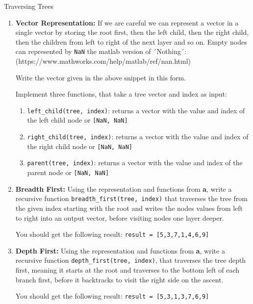 \begin{task}{Traversing Trees}{}{}
  \begin{enumerate}

    \item{\textbf{Vector
            Representation:}
          If we are careful we can represent a vector in a single vector by
          storing the root first, then the left child, then the right child, then
          the children from left to right of the next layer and so on. Empty nodes
          can represented by \lstinline!NaN! the matlab version of
          ´Nothing´: (https://www.mathworks.com/help/matlab/ref/nan.html)

          Write the vector given in the above snippet in this form.

          Implement three functions, that take a tree vector and index as input:
          \begin{enumerate}
            \item{
                  \lstinline!left_child(tree, index)!: returns a vector
                  with the value and index of the left child node or
                  \lstinline![NaN, NaN]!
                  }
            \item{
                  \lstinline!right_child(tree, index)!: returns a vector
                  with the value and index of the right child node or
                  \lstinline![NaN, NaN]!
                  }
            \item{
                  \lstinline!parent(tree, index)!: returns a vector with the
                  value and index of the parent node or \lstinline![NaN, NaN]!
                  }
          \end{enumerate}
          }

    \item{\textbf{Breadth First:}
          Using the representation and functions from \textbf{a}, write a
          recursive function \lstinline!breadth_first(tree, index)!
          that traverses the tree from the given index starting with the root and
          writes the nodes values from left to right into an output vector, before visiting nodes one layer deeper.

          You should get the following result:
          \lstinline!result = [5,3,7,1,4,6,9]!

          }

    \item{\textbf{Depth First:}
          Using the representation and functions from \textbf{a}, write a
          recursive function  \lstinline!depth_first(tree, index)!,
          that traverses the tree depth first, meaning it starts at the root and
          traverses to the bottom left of each branch first, before it backtracks to visit the
          right side on the ascent.

          You should get the following result:
          \lstinline!result = [5,3,1,3,7,6,9]!

          }

  \end{enumerate}

\end{task}
